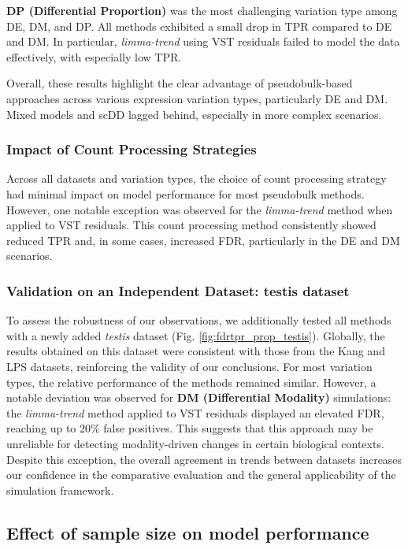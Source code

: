 \documentclass[a4paper, 11pt, twocolumn]{article}
\begin{document}
\begin{multicols}{2}
\textbf{DP (Differential Proportion)} was the most challenging variation type among DE, DM, and DP. All methods exhibited a small drop in TPR compared to DE and DM. In particular, \textit{limma-trend} using VST residuals failed to model the data effectively, with especially low TPR.

Overall, these results highlight the clear advantage of pseudobulk-based approaches across various expression variation types, particularly DE and DM. Mixed models and scDD lagged behind, especially in more complex scenarios.

\subsubsection{Impact of Count Processing Strategies}
Across all datasets and variation types, the choice of count processing strategy had minimal impact on model performance for most pseudobulk methods. However, one notable exception was observed for the \textit{limma-trend} method when applied to VST residuals. This count processing method consistently showed reduced TPR and, in some cases, increased FDR, particularly in the DE and DM scenarios.

\subsubsection{Validation on an Independent Dataset: testis dataset} 
To assess the robustness of our observations, we additionally tested all methods with a newly added \textit{testis} dataset (Fig. \ref{fig:fdrtpr_prop_testis}). Globally, the results obtained on this dataset were consistent with those from the Kang and LPS datasets, reinforcing the validity of our conclusions. For most variation types, the relative performance of the methods remained similar. However, a notable deviation was observed for \textbf{DM (Differential Modality)} simulations: the \textit{limma-trend} method applied to VST residuals displayed an elevated FDR, reaching up to 20\% false positives. This suggests that this approach may be unreliable for detecting modality-driven changes in certain biological contexts. Despite this exception, the overall agreement in trends between datasets increases our confidence in the comparative evaluation and the general applicability of the simulation framework.


\subsection{Effect of sample size on model performance}


\end{multicols}
\end{document}
